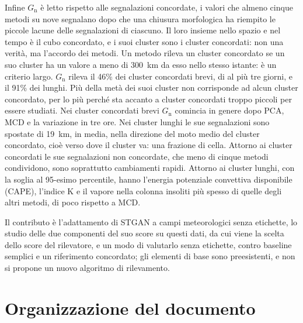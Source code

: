 Infine $G_{\mathrm{n}}$ è letto rispetto alle segnalazioni concordate, i valori che almeno cinque metodi su nove segnalano dopo che una chiusura morfologica ha riempito le piccole lacune delle segnalazioni di ciascuno. Il loro insieme nello spazio e nel tempo è il cubo concordato, e i suoi cluster sono i cluster concordati: non una verità, ma l'accordo dei metodi. Un metodo rileva un cluster concordato se un suo cluster ha un valore a meno di 300~km da esso nello stesso istante: è un criterio largo. $G_{\mathrm{n}}$ rileva il 46\% dei cluster concordati brevi, di al più tre giorni, e il 91\% dei lunghi. Più della metà dei suoi cluster non corrisponde ad alcun cluster concordato, per lo più perché sta accanto a cluster concordati troppo piccoli per essere studiati. Nei cluster concordati brevi $G_{\mathrm{n}}$ comincia in genere dopo PCA, MCD e la variazione in tre ore. Nei cluster lunghi le sue segnalazioni sono spostate di 19~km, in media, nella direzione del moto medio del cluster concordato, cioè verso dove il cluster va: una frazione di cella. Attorno ai cluster concordati le sue segnalazioni non concordate, che meno di cinque metodi condividono, sono soprattutto cambiamenti rapidi. Attorno ai cluster lunghi, con la soglia al 95-esimo percentile, hanno l'energia potenziale convettiva disponibile (CAPE), l'indice K e il vapore nella colonna insoliti più spesso di quelle degli altri metodi, di poco rispetto a MCD.

Il contributo è l'adattamento di STGAN a campi meteorologici senza etichette, lo studio delle due componenti del suo score su questi dati, da cui viene la scelta dello score del rilevatore, e un modo di valutarlo senza etichette, contro baseline semplici e un riferimento concordato; gli elementi di base sono preesistenti, e non si propone un nuovo algoritmo di rilevamento.

\section{Organizzazione del documento}

